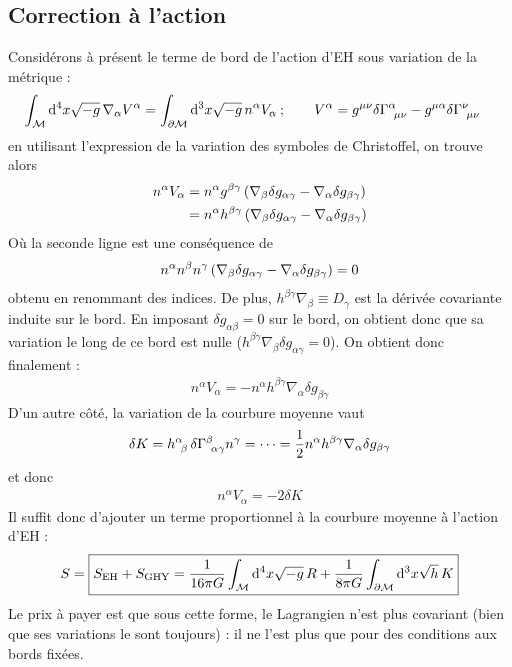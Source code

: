 \subsection{Correction à l'action}
Considérons à présent le terme de bord de l'action d'EH sous variation de la métrique :
\begin{align}
    \int_\M \td^4 x \sqrt{-g} \, \nabla_\alpha V^\alpha  = \int_{\pd\M} \td^3x \sqrt{-g} \, n^\alpha V_\alpha\: ; \quad \quad V^\alpha &= g^{\mu \nu} \delta\Gamma\indices{^{\alpha}_{\!\mu \nu}} - g^{\mu \alpha} \delta \Gamma\indices{^{\nu}_{\!\mu \nu}}
\end{align}
en utilisant l'expression de la variation des symboles de Christoffel, on trouve alors 
\begin{align}
    n^\alpha V_\alpha &= n^\alpha g^{\beta\gamma} \left( \nabla_\beta \delta g_{\alpha \gamma} - \nabla_\alpha \delta g_{\beta\gamma}\right)\\
    &= n^\alpha h^{\beta\gamma} \left( \nabla_\beta \delta g_{\alpha \gamma} - \nabla_\alpha \delta g_{\beta\gamma}\right)
\end{align}
Où la seconde ligne est une conséquence de 
\begin{align}
    n^\alpha n^\beta n^\gamma \left( \nabla_\beta \delta g_{\alpha \gamma} - \nabla_\alpha \delta g_{\beta\gamma} \right) = 0
\end{align}
obtenu en renommant des indices. De plus, $h^{\beta\gamma} \nabla_\beta \equiv D_\gamma$ est la dérivée covariante induite sur le bord. En imposant $\delta g_{\alpha \beta} = 0$ sur le bord, on obtient donc que sa variation le long de ce bord est nulle ($h^{\beta\gamma} \nabla_\beta \delta g_{\alpha\gamma} = 0$). On obtient donc finalement :
\begin{align}
    n^\alpha V_\alpha = - n^\alpha h^{\beta\gamma} \nabla_\alpha \delta g_{\beta\gamma}
\end{align}
D'un autre côté, la variation de la courbure moyenne vaut
\begin{align}
    \delta K = h\indices{^\alpha_\!_\beta}\, \delta \Gamma\indices{^\beta_{\!\alpha \gamma}} n^\gamma = \dots = \frac{1}{2}  n^\alpha h^{\beta\gamma} \nabla_\alpha \delta g_{\beta\gamma}
\end{align}
et donc
\begin{align}
    n^\alpha V_\alpha = -2 \delta K
\end{align}
Il suffit donc d'ajouter un terme proportionnel à la courbure moyenne à l'action d'EH :
\begin{align}
    S = \boxed{S_{\text{EH}} + S_{\text{GHY}} = \frac{1}{16\pi G} \int_{\mathcal{M}} \mathrm{d}^4x \sqrt{-g} \, R + \frac{1}{8\pi G} \int_{\partial \mathcal{M}} \mathrm{d}^3x \sqrt{h} \, K}
\end{align}
Le prix à payer est que sous cette forme, le Lagrangien n'est plus covariant (bien que ses variations le sont toujours) : il ne l'est plus que pour des conditions aux bords fixées. 


